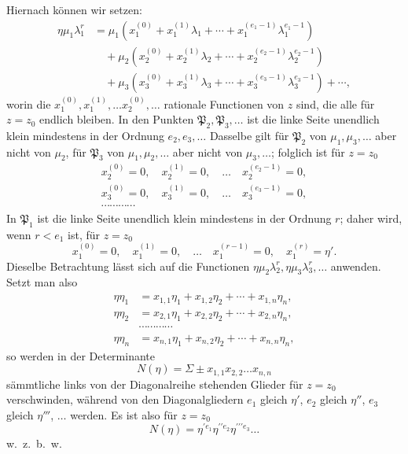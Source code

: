 \documentclass{article}
\begin{document}
Hiernach können wir setzen:
\[ \begin{aligned} \eta\mu_{1}\lambda_{1}^{r} &= \mu_{1}(x_{1}^{(0)} + x_{1}^{(1)}\lambda_{1} + \cdots + x_{1}^{(e_{1}-1)}\lambda_{1}^{e_{1}-1}) \\ &\quad + \mu_{2}(x_{2}^{(0)} + x_{2}^{(1)}\lambda_{2} + \cdots + x_{2}^{(e_{2}-1)}\lambda_{2}^{e_{2}-1}) \\ &\quad + \mu_{3}(x_{3}^{(0)} + x_{3}^{(1)}\lambda_{3} + \cdots + x_{3}^{(e_{3}-1)}\lambda_{3}^{e_{3}-1}) + \cdots, \end{aligned} \]
worin die $x_{1}^{(0)}, x_{1}^{(1)}, \ldots x_{2}^{(0)}, \ldots$ rationale Functionen von $z$ sind, die alle für $z = z_{0}$ endlich bleiben. In den Punkten $\mathfrak{P}_{2}, \mathfrak{P}_{3}, \ldots$ ist die linke Seite unendlich klein mindestens in der Ordnung $e_{2}, e_{3}, \ldots$ Dasselbe gilt für $\mathfrak{P}_{2}$ von $\mu_{1}, \mu_{3}, \ldots$ aber nicht von $\mu_{2}$, für $\mathfrak{P}_{3}$ von $\mu_{1}, \mu_{2}, \ldots$ aber nicht von $\mu_{3}, \ldots$; folglich ist für $z = z_{0}$
\[ \begin{gathered} x_{2}^{(0)} = 0, \quad x_{2}^{(1)} = 0, \quad \ldots \quad x_{2}^{(e_{2}-1)} = 0, \\ x_{3}^{(0)} = 0, \quad x_{3}^{(1)} = 0, \quad \ldots \quad x_{3}^{(e_{3}-1)} = 0, \\ \cdots\cdots\cdots\cdots \end{gathered} \]
In $\mathfrak{P}_{1}$ ist die linke Seite unendlich klein mindestens in der Ordnung $r$; daher wird, wenn $r < e_{1}$ ist, für $z = z_{0}$
\[ x_{1}^{(0)} = 0, \quad x_{1}^{(1)} = 0, \quad \ldots \quad x_{1}^{(r-1)} = 0, \quad x_{1}^{(r)} = \eta'. \]
Dieselbe Betrachtung lässt sich auf die Functionen $\eta\mu_{2}\lambda_{2}^{r}, \eta\mu_{3}\lambda_{3}^{r}, \ldots$ anwenden. Setzt man also
\[ \begin{aligned} \eta\eta_{1} &= x_{1,1}\eta_{1} + x_{1,2}\eta_{2} + \cdots + x_{1,n}\eta_{n}, \\ \eta\eta_{2} &= x_{2,1}\eta_{1} + x_{2,2}\eta_{2} + \cdots + x_{2,n}\eta_{n}, \\ &\cdots\cdots\cdots\cdots \\ \eta\eta_{n} &= x_{n,1}\eta_{1} + x_{n,2}\eta_{2} + \cdots + x_{n,n}\eta_{n}, \end{aligned} \]
so werden in der Determinante
\[ N(\eta) = \Sigma \pm x_{1,1}x_{2,2}\ldots x_{n,n} \]
sämmtliche links von der Diagonalreihe stehenden Glieder für $z = z_{0}$ verschwinden, während von den Diagonalgliedern $e_{1}$ gleich $\eta'$, $e_{2}$ gleich $\eta''$, $e_{3}$ gleich $\eta'''$, $\ldots$ werden. Es ist also für $z = z_{0}$
\[ N(\eta) = \eta^{\prime e_{1}}\eta^{\prime\prime e_{2}}\eta^{\prime\prime\prime e_{3}}\ldots \]
w.\ z.\ b.\ w.
\end{document}
